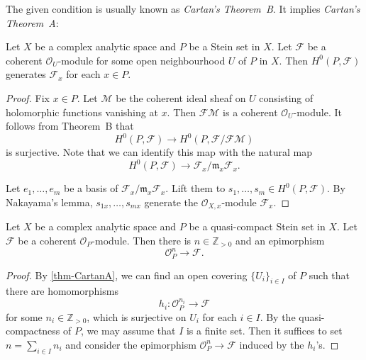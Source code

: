 The given condition is usually known as \emph{Cartan's Theorem~B}. It implies \emph{Cartan's Theorem~A}:
\begin{thm}\label{thm-CartanA}
    Let $X$ be a complex analytic space and $P$ be a Stein set in $X$. Let $\mathcal{F}$ be a coherent $\mathcal{O}_U$-module for some open neighbourhood $U$ of $P$ in $X$. Then $H^0(P,\mathcal{F})$ generates $\mathcal{F}_x$ for each $x\in P$.
\end{thm}
\begin{proof}
    Fix $x\in P$. Let $\mathcal{M}$ be the coherent ideal sheaf on $U$ consisting of holomorphic functions vanishing at $x$. Then $\mathcal{F}\mathcal{M}$ is a coherent $\mathcal{O}_U$-module. It follows from Theorem~B that
    \[
        H^0(P,\mathcal{F})\rightarrow H^0(P,\mathcal{F}/\mathcal{F}\mathcal{M})
    \]   
    is surjective. Note that we can identify this map with the natural map
    \[
        H^0(P,\mathcal{F})\rightarrow   \mathcal{F}_x/\mathfrak{m}_x \mathcal{F}_x.
    \]

    Let $e_1,\ldots,e_m$ be a basis of $\mathcal{F}_x/\mathfrak{m}_x \mathcal{F}_x$. Lift them to $s_1,\ldots,s_m\in H^0(P,\mathcal{F})$. By Nakayama's lemma, $s_{1x},\ldots,s_{mx}$ generate the $\mathcal{O}_{X,x}$-module $\mathcal{F}_x$.
\end{proof}


\begin{corollary}\label{cor-thmacohsheafquotient}
    Let $X$ be a complex analytic space and $P$ be a quasi-compact Stein set in $X$.  Let $\mathcal{F}$ be a coherent $\mathcal{O}_P$-module.
    Then there is $n\in \mathbb{Z}_{>0}$ and an epimorphism
    \[
        \mathcal{O}_P^n\rightarrow \mathcal{F}.  
    \]
\end{corollary}
\begin{proof}
    By \cref{thm-CartanA}, we can find an open covering $\{U_i\}_{i\in I}$ of $P$ such that there are homomorphisms
    \[
        h_i:\mathcal{O}_P^{n_i}\rightarrow \mathcal{F}  
    \]
    for some $n_i\in \mathbb{Z}_{>0}$, which is surjective on $U_i$ for each $i\in I$. By the quasi-compactness of $P$, we may assume that $I$ is a finite set. Then it suffices to set $n=\sum_{i\in I}n_i$ and consider the epimorphism $\mathcal{O}_P^n\rightarrow \mathcal{F}$ induced by the $h_i$'s.
\end{proof}

